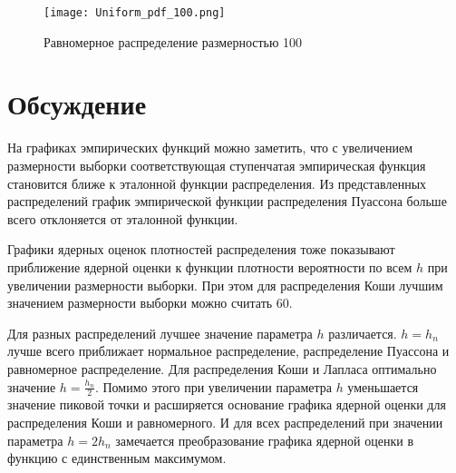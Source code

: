 \documentclass[12pt,a4paper]{article}
\begin{document}
\begin{figure}[H]
    \centering
    \texttt{[image: Uniform\_pdf\_100.png]}
    \caption{Равномерное распределение размерностью 100}
\end{figure}

\section{Обсуждение}
На графиках эмпирических функций можно заметить, что с увеличением размерности выборки соответствующая ступенчатая эмпирическая функция становится ближе к эталонной функции распределения. Из представленных распределений график эмпирической функции распределения Пуассона больше всего отклоняется от эталонной функции.

Графики ядерных оценок плотностей распределения тоже показывают приближение ядерной оценки к функции плотности вероятности по всем $h$ при увеличении размерности выборки. При этом для распределения Коши лучшим значением размерности выборки можно считать 60.

Для разных распределений лучшее значение параметра $h$ различается. $h=h_n$ лучше всего приближает нормальное распределение, распределение Пуассона и равномерное распределение. Для распределения Коши и Лапласа оптимально значение $h=\frac{h_n}{2}$. Помимо этого при увеличении параметра $h$ уменьшается значение пиковой точки и расширяется основание графика ядерной оценки для распределения Коши и равномерного. И для всех распределений при значении параметра $h=2h_n$ замечается преобразование графика ядерной оценки в функцию с единственным максимумом.
\end{document}

